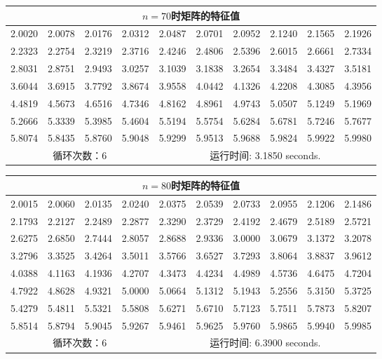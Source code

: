 \documentclass{article}
\begin{document}
\begin{table}[H]
	\centering
	\begin{tabular}{|*{10}{c|}}
		\hline
		\multicolumn{10}{|c|}{$n=70$时矩阵的特征值} \\ \hline
		2.0020 & 2.0078 & 2.0176 & 2.0312 & 2.0487 & 2.0701 & 2.0952 & 2.1240 & 2.1565 & 2.1926 \\ \hline
		2.2323 & 2.2754 & 2.3219 & 2.3716 & 2.4246 & 2.4806 & 2.5396 & 2.6015 & 2.6661 & 2.7334 \\ \hline
		2.8031 & 2.8751 & 2.9493 & 3.0257 & 3.1039 & 3.1838 & 3.2654 & 3.3484 & 3.4327 & 3.5181 \\ \hline
		3.6044 & 3.6915 & 3.7792 & 3.8674 & 3.9558 & 4.0442 & 4.1326 & 4.2208 & 4.3085 & 4.3956 \\ \hline
		4.4819 & 4.5673 & 4.6516 & 4.7346 & 4.8162 & 4.8961 & 4.9743 & 5.0507 & 5.1249 & 5.1969 \\ \hline
		5.2666 & 5.3339 & 5.3985 & 5.4604 & 5.5194 & 5.5754 & 5.6284 & 5.6781 & 5.7246 & 5.7677 \\ \hline
		5.8074 & 5.8435 & 5.8760 & 5.9048 & 5.9299 & 5.9513 & 5.9688 & 5.9824 & 5.9922 & 5.9980 \\ \hline
		\multicolumn{4}{|c|}{循环次数：6} & \multicolumn{6}{c|}{运行时间: 3.1850 seconds.} \\ \hline
	\end{tabular}
\end{table}

\begin{table}[H]
	\centering
	\begin{tabular}{|*{10}{c|}}
		\hline
		\multicolumn{10}{|c|}{$n=80$时矩阵的特征值} \\ \hline
		2.0015 & 2.0060 & 2.0135 & 2.0240 & 2.0375 & 2.0539 & 2.0733 & 2.0955 & 2.1206 & 2.1486 \\ \hline
		2.1793 & 2.2127 & 2.2489 & 2.2877 & 2.3290 & 2.3729 & 2.4192 & 2.4679 & 2.5189 & 2.5721 \\ \hline
		2.6275 & 2.6850 & 2.7444 & 2.8057 & 2.8688 & 2.9336 & 3.0000 & 3.0679 & 3.1372 & 3.2078 \\ \hline
		3.2796 & 3.3525 & 3.4264 & 3.5011 & 3.5766 & 3.6527 & 3.7293 & 3.8064 & 3.8837 & 3.9612 \\ \hline
		4.0388 & 4.1163 & 4.1936 & 4.2707 & 4.3473 & 4.4234 & 4.4989 & 4.5736 & 4.6475 & 4.7204 \\ \hline
		4.7922 & 4.8628 & 4.9321 & 5.0000 & 5.0664 & 5.1312 & 5.1943 & 5.2556 & 5.3150 & 5.3725 \\ \hline
		5.4279 & 5.4811 & 5.5321 & 5.5808 & 5.6271 & 5.6710 & 5.7123 & 5.7511 & 5.7873 & 5.8207 \\ \hline
		5.8514 & 5.8794 & 5.9045 & 5.9267 & 5.9461 & 5.9625 & 5.9760 & 5.9865 & 5.9940 & 5.9985 \\ \hline
		\multicolumn{4}{|c|}{循环次数：6} & \multicolumn{6}{c|}{运行时间: 6.3900 seconds.} \\ \hline
	\end{tabular}
\end{table}
\end{document}

